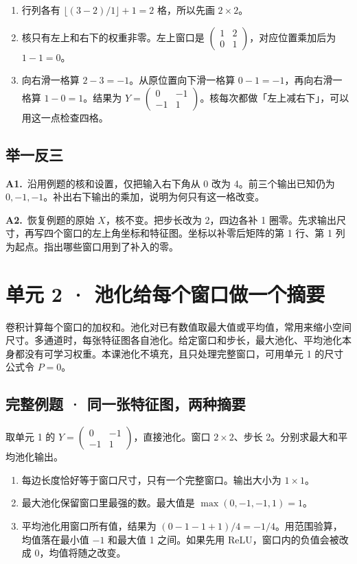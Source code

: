 \documentclass[UTF8,a4paper,11pt]{ctexart}
\newcommand{\PracticeQuestion}[3]{\par\Needspace{4\baselineskip}\noindent\begin{minipage}{\linewidth}\textbf{#1.}\ #2\par\noindent\rule{0pt}{#3mm}\par\end{minipage}\par}
\begin{document}
\begin{enumerate}
\item 行列各有 $\lfloor(3-2)/1\rfloor+1=2$ 格，所以先画 $2\times2$。
\item 核只有左上和右下的权重非零。左上窗口是 $\begin{pmatrix}1&2\\0&1\end{pmatrix}$，对应位置乘加后为 $1-1=0$。
\item 向右滑一格算 $2-3=-1$。从原位置向下滑一格算 $0-1=-1$，再向右滑一格算 $1-0=1$。结果为 $Y=\begin{pmatrix}0&-1\\-1&1\end{pmatrix}$。核每次都做「左上减右下」，可以用这一点检查四格。
\end{enumerate}
\subsection{举一反三}
\PracticeQuestion{A1}{沿用例题的核和设置，仅把输入右下角从 0 改为 4。前三个输出已知仍为 $0,-1,-1$。补出右下输出的乘加，说明为何只有这一格改变。}{23}
\PracticeQuestion{A2}{恢复例题的原始 $X$，核不变。把步长改为 2，四边各补 1 圈零。先求输出尺寸，再写四个窗口的左上角坐标和特征图。坐标以补零后矩阵的第 1 行、第 1 列为起点。指出哪些窗口用到了补入的零。}{26}
\clearpage
\section{单元 2 · 池化给每个窗口做一个摘要}
卷积计算每个窗口的加权和。池化对已有数值取最大值或平均值，常用来缩小空间尺寸。多通道时，每张特征图各自池化。给定窗口和步长，最大池化、平均池化本身都没有可学习权重。本课池化不填充，且只处理完整窗口，可用单元 1 的尺寸公式令 $P=0$。

\subsection{完整例题 · 同一张特征图，两种摘要}
取单元 1 的 $Y=\begin{pmatrix}0&-1\\-1&1\end{pmatrix}$，直接池化。窗口 $2\times2$、步长 2。分别求最大和平均池化输出。

\begin{enumerate}
\item 每边长度恰好等于窗口尺寸，只有一个完整窗口。输出大小为 $1\times1$。
\item 最大池化保留窗口里最强的数。最大值是 $\max(0,-1,-1,1)=1$。
\item 平均池化用窗口所有值，结果为 $(0-1-1+1)/4=-1/4$。用范围验算，均值落在最小值 $-1$ 和最大值 1 之间。如果先用 ReLU，窗口内的负值会被改成 0，均值将随之改变。
\end{enumerate}
\end{document}
